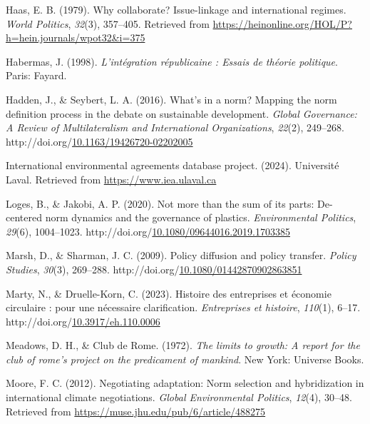\documentclass[12pt]{ulaval}
\newenvironment{CSLReferences}%
  {}%
  {\par}
\begin{document}
\begin{CSLReferences}{1}{0}
Haas, E. B. (1979). Why collaborate? Issue-linkage and international regimes. \emph{World Politics}, \emph{32}(3), 357--405. Retrieved from \url{https://heinonline.org/HOL/P?h=hein.journals/wpot32&i=375}

Habermas, J. (1998). \emph{L'intégration républicaine : Essais de théorie politique}. Paris: Fayard.

Hadden, J., \& Seybert, L. A. (2016). What's in a norm? Mapping the norm definition process in the debate on sustainable development. \emph{Global Governance: A Review of Multilateralism and International Organizations}, \emph{22}(2), 249--268. http://doi.org/\href{https://doi.org/10.1163/19426720-02202005}{10.1163/19426720-02202005}

International environmental agreements database project. (2024). Université Laval. Retrieved from \url{https://www.iea.ulaval.ca}

Loges, B., \& Jakobi, A. P. (2020). Not more than the sum of its parts: De-centered norm dynamics and the governance of plastics. \emph{Environmental Politics}, \emph{29}(6), 1004--1023. http://doi.org/\href{https://doi.org/10.1080/09644016.2019.1703385}{10.1080/09644016.2019.1703385}

Marsh, D., \& Sharman, J. C. (2009). Policy diffusion and policy transfer. \emph{Policy Studies}, \emph{30}(3), 269--288. http://doi.org/\href{https://doi.org/10.1080/01442870902863851}{10.1080/01442870902863851}

Marty, N., \& Druelle-Korn, C. (2023). Histoire des entreprises et économie circulaire : pour une nécessaire clarification. \emph{Entreprises et histoire}, \emph{110}(1), 6--17. http://doi.org/\href{https://doi.org/10.3917/eh.110.0006}{10.3917/eh.110.0006}

Meadows, D. H., \& Club de Rome. (1972). \emph{The limits to growth: A report for the club of rome's project on the predicament of mankind}. New York: Universe Books.

Moore, F. C. (2012). Negotiating adaptation: Norm selection and hybridization in international climate negotiations. \emph{Global Environmental Politics}, \emph{12}(4), 30--48. Retrieved from \url{https://muse.jhu.edu/pub/6/article/488275}


\end{CSLReferences}
\end{document}
